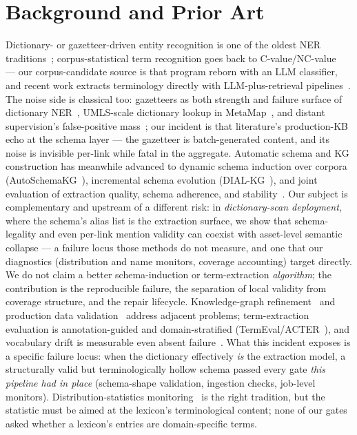 \documentclass[sigconf,nonacm,anonymous]{acmart}
\begin{document}
\section{Background and Prior Art}\label{sec:related}

Dictionary- or gazetteer-driven entity recognition is one of the oldest
NER traditions~\cite{nerSurvey}; corpus-statistical term recognition
goes back to C-value/NC-value~\cite{cvalue} --- our corpus-candidate
source is that program reborn with an LLM classifier, and recent work
extracts terminology directly with LLM-plus-retrieval
pipelines~\cite{llmterm}. The noise side is classical too: gazetteers
as both strength and failure surface of dictionary
NER~\cite{mikheev}, UMLS-scale dictionary lookup in
MetaMap~\cite{metamap}, and distant supervision's false-positive
mass~\cite{mintz}; our incident is that literature's production-KB
echo at the schema layer --- the gazetteer is batch-generated content,
and its noise is invisible per-link while fatal in the aggregate.
Automatic schema and KG construction has
meanwhile advanced to dynamic schema induction over corpora
(AutoSchemaKG~\cite{autoschemakg}), incremental schema evolution
(DIAL-KG~\cite{dialkg}), and joint evaluation of extraction quality,
schema adherence, and stability~\cite{schemakgeval}. Our subject is
complementary and upstream of a different risk: in \emph{dictionary-scan
deployment}, where the schema's alias list is the extraction surface,
we show that schema-legality and even per-link mention validity can
coexist with asset-level semantic collapse --- a failure locus those
methods do not measure, and one that our diagnostics (distribution and
name monitors, coverage accounting) target directly. We do not claim a
better schema-induction or term-extraction \emph{algorithm}; the
contribution is the reproducible failure, the separation of local
validity from coverage structure, and the repair lifecycle.
Knowledge-graph
refinement~\cite{paulheim} and production data
validation~\cite{tdd,deequ} address adjacent problems; term-extraction
evaluation is annotation-guided and domain-stratified
(TermEval/ACTER~\cite{termeval}), and vocabulary drift is measurable
even absent failure~\cite{hamilton16}. What this incident exposes is a specific failure locus: when the
dictionary effectively \emph{is} the extraction model, a structurally
valid but terminologically hollow schema passed every gate \emph{this
pipeline had in place} (schema-shape validation, ingestion checks,
job-level monitors). Distribution-statistics monitoring~\cite{tdd} is
the right tradition, but the statistic must be aimed at the lexicon's
terminological content; none of our gates asked whether a lexicon's
entries are domain-specific terms.
\end{document}
